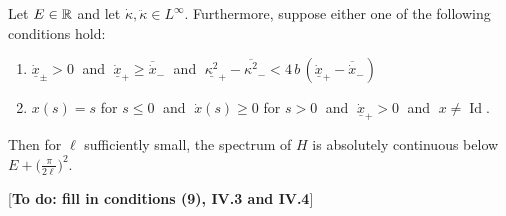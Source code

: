 \begin{thm}
    Let $E \in \mathbb{R}$ and let $\dot\kappa, \ddot\kappa \in L^\infty$. Furthermore, suppose either one of the following conditions hold:
    \begin{enumerate}
        \item $\underline{\dot x}_\pm > 0 \;$ and $\; \underline{\dot x}_+ \geq \overline{\dot x}_- \;$ and $\; \underline{\kappa^2}_+ - \overline{\kappa^2}_- < 4 \, b \, (\underline{\dot x}_+ - \overline{\dot x}_-)$
        \item $x(s) = s$ for $s \leq 0 \;$ and $\; \dot x(s) \geq 0$ for $s>0 \;$ and $\; \underline{\dot x}_+ > 0 \;$ and $\; x \neq \operatorname{Id}$.
    \end{enumerate}
    Then for $\ell$ sufficiently small, the spectrum of $H$ is absolutely continuous below $E + \big( \frac{\pi}{2\ell} \big)^2$.
\end{thm}

[\textbf{To do: fill in conditions (9), IV.3 and IV.4}]

